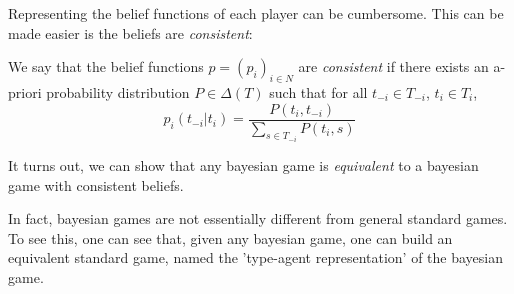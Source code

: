  Representing the belief functions of each player can be cumbersome. This can be made easier is the beliefs are \emph{consistent}:
 \begin{definition}
 We say that the belief functions $p = (p_i)_{i \in N}$ are \emph{consistent} if there exists an a-priori probability distribution $P \in \Delta(T)$ such that for all $t_{-i} \in T_{-i} $, $t_i \in T_i$,
  $$ p_i(t_{-{i}} | t_i) = \frac{P(t_i, t_{-i})}{\sum_{s \in T_{-i}} P( t_i, s) } $$
 \end{definition}
It turns out, we can show that any bayesian game is \emph{equivalent} to a bayesian game with consistent beliefs.


In fact, bayesian games are not essentially different from general standard games.  To see this, one can see that, given any bayesian game,  one can build an equivalent standard game, named the 'type-agent representation' of the bayesian game.

